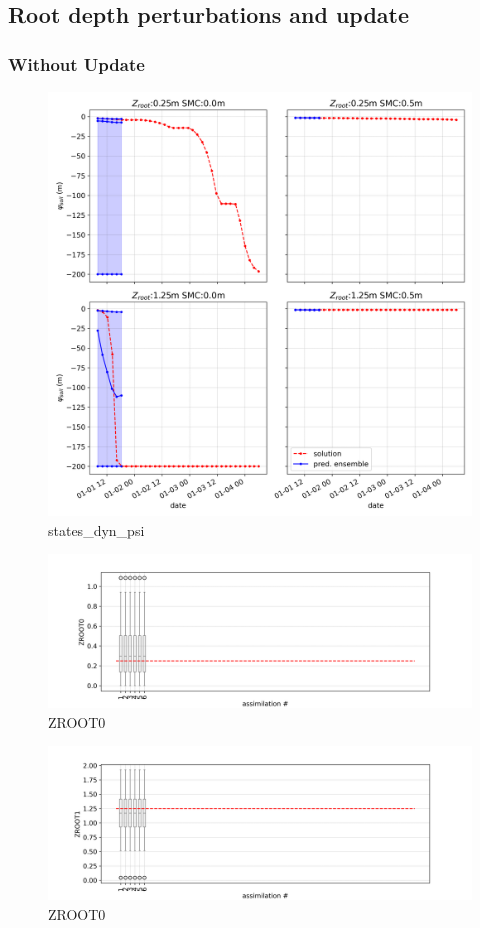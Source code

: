 \documentclass{article}
\begin{document}
\subsection{Root depth perturbations and update}

\subsubsection{Without Update}

\begin{figure}[!htbp]
\centering
\includegraphics[width=0.75\linewidth]{files/states_dyn_psi-68368e11811a97694a714da212117983.png}
\caption[]{states\_dyn\_psi}
\label{states_dyn_psi}
\end{figure}

\begin{figure}[!htbp]
\centering
\includegraphics[width=0.75\linewidth]{files/ZROOT0-7a4a9fa8cfc5ad5d17d9cf18aec10168.png}
\caption[]{ZROOT0}
\label{ZROOT0}
\end{figure}

\begin{figure}[!htbp]
\centering
\includegraphics[width=0.75\linewidth]{files/ZROOT1-8b881abf587ac163f38dd9171ee4226a.png}
\caption[]{ZROOT0}
\label{ZROOT1}
\end{figure}
\end{document}
